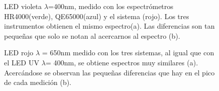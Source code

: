 \begin{figure}[h]
	\centering
	
	\caption[LED violeta $\lambda$= 400nm]{LED violeta $\lambda$=400nm, medido con los espectrómetros HR4000(verde), QE65000(azul) y el sistema (rojo). Los tres instrumentos obtienen el mismo espectro(a). Las diferencias son tan pequeñas que solo se notan al acercarnos al espectro (b).}
	\label{fig:uv400}
\end{figure}
\begin{figure}[h]
	\centering

	\caption[LED rojo $\lambda$ = 650nm]{LED rojo $\lambda$ = 650nm medido con los tres sistemas, al igual que con el LED UV $\lambda$= 400nm, se obtiene espectros muy similares (a). Acercándose se observan las pequeñas diferencias que hay en el pico de cada medición (b).}
	\label{fig:rojot}
\end{figure}

